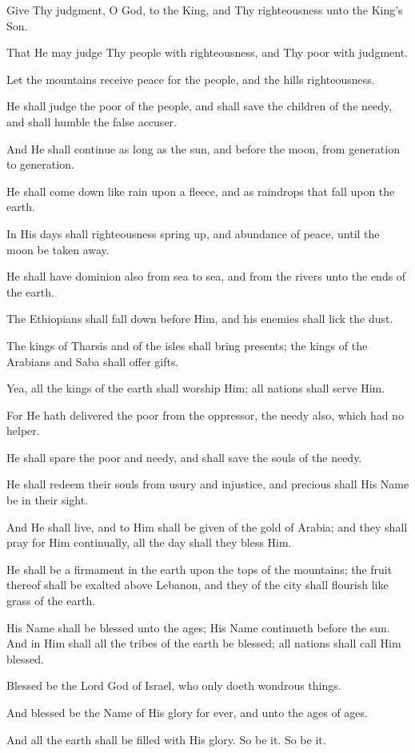 Give Thy judgment, O God, to the King, and Thy righteousness unto the King's Son.

That He may judge Thy people with righteousness, and Thy poor with judgment.

Let the mountains receive peace for the people, and the hills righteousness.

He shall judge the poor of the people, and shall save the children of the needy, and shall humble the false accuser.

And He shall continue as long as the sun, and before the moon, from generation to generation.

He shall come down like rain upon a fleece, and as raindrops that fall upon the earth.

In His days shall righteousness spring up, and abundance of peace, until the moon be taken away.

He shall have dominion also from sea to sea, and from the rivers unto the ends of the earth.

The Ethiopians shall fall down before Him, and his enemies shall lick the dust.

The kings of Tharsis and of the isles shall bring presents; the kings of the Arabians and Saba shall offer gifts.

Yea, all the kings of the earth shall worship Him; all nations shall serve Him.

For He hath delivered the poor from the oppressor, the needy also, which had no helper.

He shall spare the poor and needy, and shall save the souls of the needy.

He shall redeem their souls from usury and injustice, and precious shall His Name be in their sight.

And He shall live, and to Him shall be given of the gold of Arabia; and they shall pray for Him continually, all the day shall they bless Him.

He shall be a firmament in the earth upon the tops of the mountains; the fruit thereof shall be exalted above Lebanon, and they of the city shall flourish like grass of the earth.

His Name shall be blessed unto the ages; His Name continueth before the sun. And in Him shall all the tribes of the earth be blessed; all nations shall call Him blessed.

Blessed be the Lord God of Israel, who only doeth wondrous things.

And blessed be the Name of His glory for ever, and unto the ages of ages.

And all the earth shall be filled with His glory. So be it. So be it.
